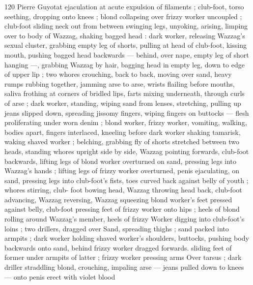 120 Pierre Guyotat
ejaculation at acute expulsion of filaments ; club-foot, torso
seething, dropping onto knees ; blond collapsing over frizzy worker
uncoupled ; club-foot sliding neck out from between swinging legs,
unyoking, arising, limping over to body of Wazzag, shaking bagged
head : dark worker, releasing Wazzag's sexual cluster, grabbing
empty leg of shorts, pulling at head of club-foot, kissing mouth,
pushing bagged head backwards — behind, over nape, empty leg of
short hanging —, grabbing Wazzag by hair, bagging head in empty
leg, down to edge of upper lip ; two whores crouching, back to back,
moving over sand, heavy rumps rubbing together, jamming arse to
arse, wrists flailing before mouths, saliva frothing at corners of
bridled lips, farts mixing underneath, through curls of arse ; dark
worker, standing, wiping sand from lenses, stretching, pulling up
jeans slipped down, spreading jissomy fingers, wiping fingers on
buttocks — flesh proliferating under worn denim ; blond worker,
frizzy worker, vomiting, walking, bodies apart, fingers interlaced,
kneeling before dark worker shaking tamarisk, waking shaved worker
; belching, grabbing fly of shorts stretched between two heads,
standing whores upright side by side, Wazzag pointing forwards,
club-foot backwards, lifting legs of blond worker overturned on
sand, pressing legs into Wazzag's hands ; lifting legs of frizzy worker
overturned, penis ejaculating, on sand, pressing legs into club-foot's
fists, toes curved back against belly of youth ; whores stirring, club-
foot bowing head, Wazzag throwing head back, club-foot advancing,
Wazzag reversing, Wazzag squeezing blond worker's feet pressed
against belly, club-foot pressing feet of frizzy worker onto hips ;
heels of blond rolling around Wazzag's member, heels of frizzy
Worker digging into club-foot's loins ; two drillers, dragged over
Sand, spreading thighs ; sand packed into armpits ; dark worker
holding shaved worker's shoulders, buttocks, pushing body
backwards onto sand, behind frizzy worker dragged forwards. sliding
feet of former under armpits of latter ; frizzy worker pressing arms
Over tarsus ; dark driller straddling blond, crouching, impaling arse
— jeans pulled down to knees — onto penis erect with violet blood

